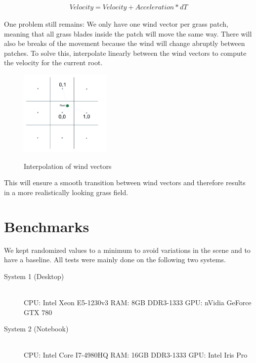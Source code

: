 \documentclass[conference]{acmsiggraph}
\begin{document}
\begin{center}
\begin{align}
Velocity = Velocity + Acceleration * dT
\end{align}
\end{center}

One problem still remains: We only have one wind vector per grass patch, meaning that all grass blades inside the patch will move the same way. There will also be breaks of the movement because the wind will change abruptly between patches. To solve this, interpolate linearly between the wind vectors to compute the velocity for the current root.

 \begin{figure}[ht]
   \centering
   \includegraphics[width=1.75in]{images/wind_field_interpolation}
   \caption{Interpolation of wind vectors} \cite{EddieLee}
 \end{figure}

This will ensure a smooth transition between wind vectors and therefore results in a more realistically looking grass field.

\section{Benchmarks}
We kept randomized values to a minimum to avoid variations in the scene and to have a baseline. All tests were mainly done on the following two systems.

\begin{flushleft}
\begin{description}
  \item[System 1 (Desktop)] \hfill \\
  CPU: Intel Xeon E5-1230v3 \linebreak
  RAM: 8GB DDR3-1333 \linebreak
  GPU: nVidia GeForce GTX 780
  \item[System 2 (Notebook)] \hfill \\
  CPU: Intel Core I7-4980HQ \linebreak
  RAM: 16GB DDR3-1333 \linebreak
  GPU: Intel Iris Pro
\end{description}
\end{flushleft}
\end{document}
